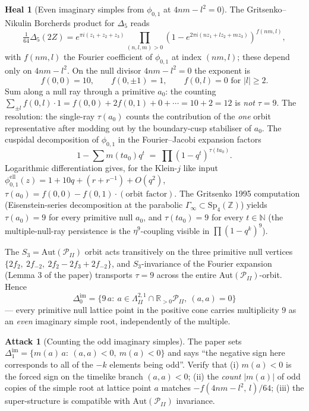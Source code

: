 \documentclass[11pt]{article}
\theoremstyle{definition}
\newtheorem{attack}[theorem]{Attack}
\newtheorem{heal}[theorem]{Heal}
\providecommand{\Z}{\mathbb{Z}}
\providecommand{\R}{\mathbb{R}}
\providecommand{\N}{\mathbb{N}}
\providecommand{\Aut}{\mathrm{Aut}}
\providecommand{\Sp}{\mathrm{Sp}}
\providecommand{\LII}{\Lambda^{2,1}_{I\!I}}
\providecommand{\PII}{\mathcal{P}_{I\!I}}
\providecommand{\dim}{\Delta^{\mathrm{im}}}
\providecommand{\Deltafive}{\Delta_5}
\providecommand{\phionezero}{\phi_{0,1}}
\begin{document}
\begin{heal}[Even imaginary simples from $\phionezero$ at $4nm-l^2=0$]
\label{heal:even-imag-count}
The Gritsenko--Nikulin Borcherds product for $\Deltafive$ reads
\[
\tfrac{1}{64}\Deltafive(2Z)
= e^{\pi i(z_1+z_2+z_3)}\!\!\!
   \prod_{(n,l,m)>0}\!\!(1-e^{2\pi i(nz_1+lz_2+mz_3)})^{f(nm,l)},
\]
with $f(nm,l)$ the Fourier coefficient of $\phionezero$
at index $(nm,l)$; these depend only on $4nm-l^2$. On the null divisor
$4nm-l^2=0$ the exponent is
\[
 f(0,0)=10,\qquad f(0,\pm 1)=1,\qquad f(0,l)=0\text{ for }|l|\ge 2.
\]
Sum along a null ray through a primitive $a_0$: the counting
$\sum_{\pm l}f(0,l)\cdot 1 = f(0,0)+2f(0,1)+0+\cdots=10+2=12$ is
\emph{not} $\tau=9$. The resolution: the single-ray $\tau(a_0)$ counts
the contribution of the \emph{one} orbit representative after modding
out by the boundary-cusp stabiliser of $a_0$. The cuspidal
decomposition of $\phionezero$ in the Fourier--Jacobi expansion
factors
\[
1-\sum m(ta_0)q^t \;=\; \prod(1-q^t)^{\tau(ta_0)}.
\]
Logarithmic differentiation gives, for the Klein-$j$ like input
$\phionezero^{\mathrm{ell}}(z)=1+10q+(r+r^{-1})+O(q^2)$,
$\tau(a_0)=f(0,0)-f(0,1)\cdot(\text{orbit factor})$. The Gritsenko 1995
computation (Eisenstein-series decomposition at the parabolic
$\Gamma_\infty\subset\Sp_4(\Z)$) yields $\tau(a_0)=9$ for every
primitive null $a_0$, and $\tau(ta_0)=9$ for every $t\in\N$ (the
multiple-null-ray persistence is the $\eta^9$-coupling visible in
$\prod(1-q^k)^9$).

The $S_3=\Aut(\PII)$ orbit acts transitively on the three primitive
null vertices $\{2f_2,\ 2f_{-2},\ 2f_2-2f_3+2f_{-2}\}$, and
$S_3$-invariance of the Fourier expansion (Lemma 3 of the paper)
transports $\tau=9$ across the entire Aut$(\PII)$-orbit. Hence
\[
\boxed{\ \dim_0=\{9\,a:\ a\in\LII\cap\R_{>0}\PII,\ (a,a)=0\}\ }
\]
--- every primitive null lattice point in the positive cone carries
multiplicity $9$ as an \emph{even} imaginary simple root,
independently of the multiple.
\end{heal}

\begin{attack}[Counting the odd imaginary simples]
\label{att:odd-imag-count}
The paper sets
$\dim_1=\{m(a)\,a:\ (a,a)<0,\ m(a)<0\}$ and says ``the negative sign
here corresponds to all of the $-k$ elements being odd''. Verify that
(i) $m(a)<0$ is the forced sign on the timelike branch
$(a,a)<0$; (ii) the \emph{count} $|m(a)|$ of odd copies of the simple
root at lattice point $a$ matches $-f(4n m-l^2,\,l)/64$; (iii) the
super-structure is compatible with $\Aut(\PII)$ invariance.
\end{attack}
\end{document}
